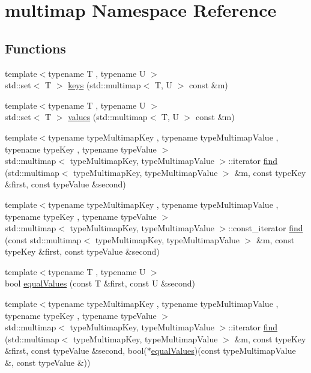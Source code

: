 \hypertarget{namespacemultimap}{}\section{multimap Namespace Reference}
\label{namespacemultimap}
\subsection*{Functions}
\begin{DoxyCompactItemize}
\item 
{\footnotesize template$<$typename T , typename U $>$ }\\std\+::set$<$ T $>$ \hyperlink{namespacemultimap_a1d03380ed2365e307412efab3c41731f}{keys} (std\+::multimap$<$ T, U $>$ const \&m)
\item 
{\footnotesize template$<$typename T , typename U $>$ }\\std\+::set$<$ T $>$ \hyperlink{namespacemultimap_a0b99e1d5a2730d58caee6e020509da9d}{values} (std\+::multimap$<$ T, U $>$ const \&m)
\item 
{\footnotesize template$<$typename type\+Multimap\+Key , typename type\+Multimap\+Value , typename type\+Key , typename type\+Value $>$ }\\std\+::multimap$<$ type\+Multimap\+Key, type\+Multimap\+Value $>$\+::iterator \hyperlink{namespacemultimap_a1824643a35a661af8c8975b16b273142}{find} (std\+::multimap$<$ type\+Multimap\+Key, type\+Multimap\+Value $>$ \&m, const type\+Key \&first, const type\+Value \&second)
\item 
{\footnotesize template$<$typename type\+Multimap\+Key , typename type\+Multimap\+Value , typename type\+Key , typename type\+Value $>$ }\\std\+::multimap$<$ type\+Multimap\+Key, type\+Multimap\+Value $>$\+::const\+\_\+iterator \hyperlink{namespacemultimap_a672ee23e88b5c884555bcb6cc8d085b3}{find} (const std\+::multimap$<$ type\+Multimap\+Key, type\+Multimap\+Value $>$ \&m, const type\+Key \&first, const type\+Value \&second)
\item 
{\footnotesize template$<$typename T , typename U $>$ }\\bool \hyperlink{namespacemultimap_a68f763c0d3546ccd9cc14f5219559e08}{equal\+Values} (const T \&first, const U \&second)
\item 
{\footnotesize template$<$typename type\+Multimap\+Key , typename type\+Multimap\+Value , typename type\+Key , typename type\+Value $>$ }\\std\+::multimap$<$ type\+Multimap\+Key, type\+Multimap\+Value $>$\+::iterator \hyperlink{namespacemultimap_a3c5bc8037151780c38835c7f8a2f0722}{find} (std\+::multimap$<$ type\+Multimap\+Key, type\+Multimap\+Value $>$ \&m, const type\+Key \&first, const type\+Value \&second, bool($\ast$\hyperlink{namespacemultimap_a68f763c0d3546ccd9cc14f5219559e08}{equal\+Values})(const type\+Multimap\+Value \&, const type\+Value \&))

\end{DoxyCompactItemize}
